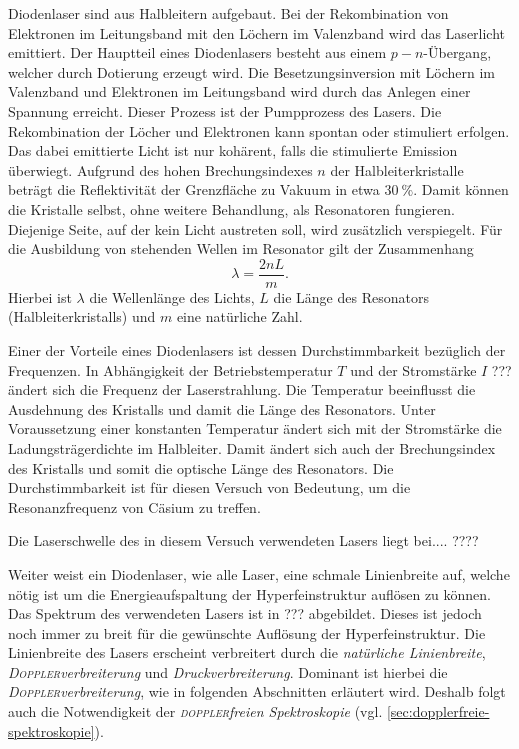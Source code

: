 \documentclass[../bericht.tex]{subfiles}
\begin{document}
      Diodenlaser sind aus Halbleitern aufgebaut. Bei der Rekombination von Elektronen im Leitungsband mit den Löchern im Valenzband wird das Laserlicht emittiert. Der Hauptteil eines Diodenlasers besteht aus einem $p-n$-Übergang, welcher durch Dotierung erzeugt wird. Die Besetzungsinversion mit Löchern im Valenzband und Elektronen im Leitungsband wird durch das Anlegen einer Spannung erreicht. Dieser Prozess ist der Pumpprozess des Lasers. Die Rekombination der Löcher und Elektronen kann spontan oder stimuliert erfolgen. Das dabei emittierte Licht ist nur kohärent, falls die stimulierte Emission überwiegt. Aufgrund des hohen Brechungsindexes $n$ der Halbleiterkristalle beträgt die Reflektivität der Grenzfläche zu Vakuum in etwa $\SI{30}{\percent}$. Damit können die Kristalle selbst, ohne weitere Behandlung, als Resonatoren fungieren. Diejenige Seite, auf der kein Licht austreten soll, wird zusätzlich verspiegelt. Für die Ausbildung von stehenden Wellen im Resonator gilt der Zusammenhang
      \begin{equation*}
        \lambda = \frac{2nL}{m}.
      \end{equation*}
      Hierbei ist $\lambda$ die Wellenlänge des Lichts, $L$ die Länge des Resonators (Halbleiterkristalls) und $m$ eine natürliche Zahl.

      Einer der Vorteile eines Diodenlasers ist dessen Durchstimmbarkeit bezüglich der Frequenzen. In Abhängigkeit der Betriebstemperatur $T$ und der Stromstärke $I$ ??? ändert sich die Frequenz der Laserstrahlung. Die Temperatur beeinflusst die Ausdehnung des Kristalls und damit die Länge des Resonators. Unter Voraussetzung einer konstanten Temperatur ändert sich mit der Stromstärke die Ladungsträgerdichte im Halbleiter. Damit ändert sich auch der Brechungsindex des Kristalls und somit die optische Länge des Resonators.
      Die Durchstimmbarkeit ist für diesen Versuch von Bedeutung, um die Resonanzfrequenz von Cäsium zu treffen.

      Die Laserschwelle des in diesem Versuch verwendeten Lasers liegt bei.... ????

      Weiter weist ein Diodenlaser, wie alle Laser, eine schmale Linienbreite auf, welche nötig ist um die Energieaufspaltung der Hyperfeinstruktur auflösen zu können. Das Spektrum des verwendeten Lasers ist in ??? abgebildet. Dieses ist jedoch noch immer zu breit für die gewünschte Auflösung der Hyperfeinstruktur. Die Linienbreite des Lasers erscheint verbreitert durch die \textit{natürliche Linienbreite}, \textit{\textsc{Doppler}verbreiterung} und \textit{Druckverbreiterung}. Dominant ist hierbei die \textit{\textsc{Doppler}verbreiterung}, wie in folgenden Abschnitten erläutert wird. Deshalb folgt auch die Notwendigkeit der \textit{\textsc{doppler}freien Spektroskopie} (vgl. \ref{sec:dopplerfreie-spektroskopie}).
\end{document}
